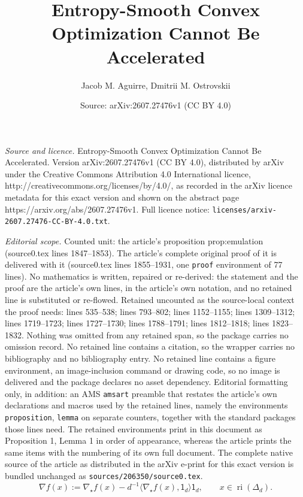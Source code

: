 \documentclass[10pt,a4paper]{amsart}
\title{Entropy-Smooth Convex Optimization Cannot Be Accelerated}
\author{Jacob M. Aguirre, Dmitrii M. Ostrovskii}
\date{Source: arXiv:2607.27476v1 (CC BY 4.0)}
\newcommand{\Simp}{\Delta_d}
\newcommand{\bnabla}{\nabla}
\newcommand{\ones}{\mathsf{1}_d}
\newcommand{\ri}{\operatorname{ri}}
\begin{document}
\maketitle

\noindent\emph{Source and licence.} Entropy-Smooth Convex Optimization Cannot Be Accelerated. Version arXiv:2607.27476v1 (CC BY 4.0), distributed by arXiv under the Creative Commons Attribution 4.0 International licence, http://creativecommons.org/licenses/by/4.0/, as recorded in the arXiv licence metadata for this exact version and shown on the abstract page https://arxiv.org/abs/2607.27476v1. Full licence notice: \texttt{licenses/arxiv-2607.27476-CC-BY-4.0.txt}.\par\smallskip

\noindent\textit{Editorial scope.} Counted unit: the article's proposition prop:emulation (source0.tex lines 1847--1853). The article's complete original proof of it is delivered with it (source0.tex lines 1855--1931, one \texttt{proof} environment of 77 lines). No mathematics is written, repaired or re-derived: the statement and the proof are the article's own lines, in the article's own notation, and no retained line is substituted or re-flowed.  Retained uncounted as the source-local context the proof needs: lines 535--538; lines 793--802; lines 1152--1155; lines 1309--1312; lines 1719--1723; lines 1727--1730; lines 1788--1791; lines 1812--1818; lines 1823--1832.  Nothing was omitted from any retained span, so the package carries no omission record.  No retained line contains a citation, so the wrapper carries no bibliography and no bibliography entry.  No retained line contains a figure environment, an image-inclusion command or drawing code, so no image is delivered and the package declares no asset dependency.  Editorial formatting only, in addition: an AMS \texttt{amsart} preamble that restates the article's own declarations and macros used by the retained lines, namely the environments \texttt{proposition}, \texttt{lemma} on separate counters, together with the standard packages those lines need.  The retained environments print in this document as Proposition 1, Lemma 1 in order of appearance, whereas the article prints the same items with the numbering of its own full document.  The complete native source of the article as distributed in the arXiv e-print for this exact version is bundled unchanged as \texttt{sources/206350/source0.tex}.
\begin{equation}
\label{eq:grad-tangent}
\bnabla f(x) := \nabla_\star f(x) - d^{-1}  \langle \nabla_\star f(x), \ones\rangle \ones, \qquad x \in \ri(\Simp).
\end{equation}
\end{document}

